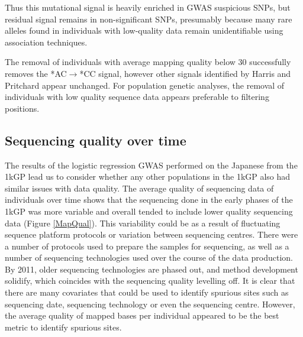 \documentclass[9pt,lineno]{elife}
\begin{document}
Thus this mutational signal is heavily enriched in GWAS suspicious SNPs, but residual signal remains in non-significant SNPs, presumably because many rare alleles found in individuals with low-quality data remain unidentifiable using association techniques. 

The removal of individuals with average mapping quality below 30 successfully removes the *AC${\rightarrow}$*CC signal, however other signals identified by Harris and Pritchard appear unchanged. 
For population genetic analyses, the removal of individuals with low quality sequence data appears preferable to filtering positions. 

	\subsection{Sequencing quality over time}
The results of the logistic regression GWAS performed on the Japanese from the 1kGP lead us to consider whether any other populations in the 1kGP also had similar issues with data quality.
The average quality of sequencing data of individuals over time shows that the sequencing done in the early phases of the 1kGP was more variable and overall tended to include lower quality sequencing data (Figure \ref{MapQual}).
This variability could be as a result of fluctuating sequence platform protocols or variation between sequencing centres.
There were a number of protocols used to prepare the samples for sequencing, as well as a number of sequencing technologies used over the course of the data production.
By 2011, older sequencing technologies are phased out, and method development solidify, which coincides with the sequencing quality levelling off.
It is clear that there are many covariates that could be used to identify spurious sites such as sequencing date, sequencing technology or even the sequencing centre. 
However, the average quality of mapped bases per individual appeared to be the best metric to identify spurious sites.
\end{document}
